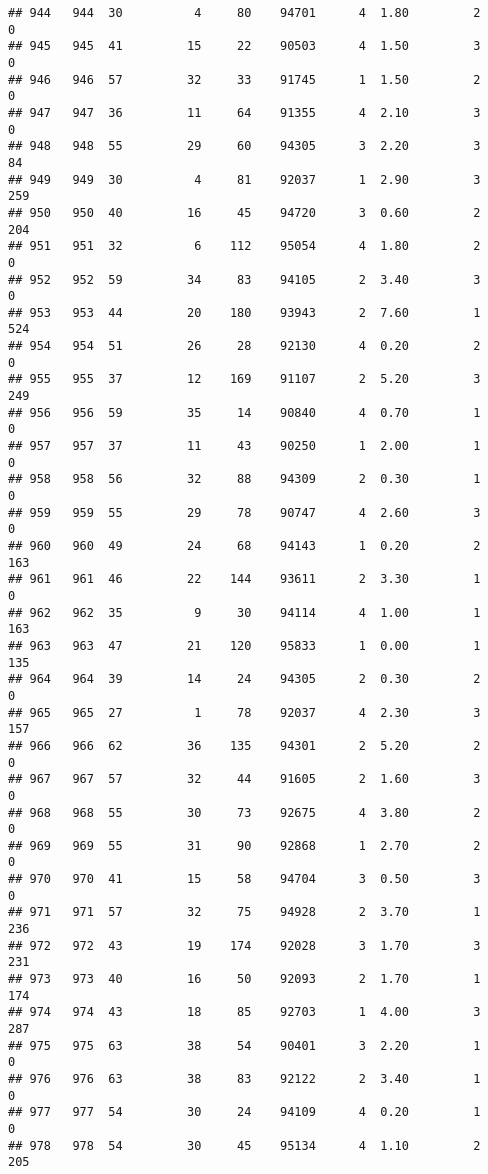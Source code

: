 \documentclass[
]{article}
\begin{document}
\begin{verbatim}
## 944   944  30          4     80    94701      4  1.80         2        0
## 945   945  41         15     22    90503      4  1.50         3        0
## 946   946  57         32     33    91745      1  1.50         2        0
## 947   947  36         11     64    91355      4  2.10         3        0
## 948   948  55         29     60    94305      3  2.20         3       84
## 949   949  30          4     81    92037      1  2.90         3      259
## 950   950  40         16     45    94720      3  0.60         2      204
## 951   951  32          6    112    95054      4  1.80         2        0
## 952   952  59         34     83    94105      2  3.40         3        0
## 953   953  44         20    180    93943      2  7.60         1      524
## 954   954  51         26     28    92130      4  0.20         2        0
## 955   955  37         12    169    91107      2  5.20         3      249
## 956   956  59         35     14    90840      4  0.70         1        0
## 957   957  37         11     43    90250      1  2.00         1        0
## 958   958  56         32     88    94309      2  0.30         1        0
## 959   959  55         29     78    90747      4  2.60         3        0
## 960   960  49         24     68    94143      1  0.20         2      163
## 961   961  46         22    144    93611      2  3.30         1        0
## 962   962  35          9     30    94114      4  1.00         1      163
## 963   963  47         21    120    95833      1  0.00         1      135
## 964   964  39         14     24    94305      2  0.30         2        0
## 965   965  27          1     78    92037      4  2.30         3      157
## 966   966  62         36    135    94301      2  5.20         2        0
## 967   967  57         32     44    91605      2  1.60         3        0
## 968   968  55         30     73    92675      4  3.80         2        0
## 969   969  55         31     90    92868      1  2.70         2        0
## 970   970  41         15     58    94704      3  0.50         3        0
## 971   971  57         32     75    94928      2  3.70         1      236
## 972   972  43         19    174    92028      3  1.70         3      231
## 973   973  40         16     50    92093      2  1.70         1      174
## 974   974  43         18     85    92703      1  4.00         3      287
## 975   975  63         38     54    90401      3  2.20         1        0
## 976   976  63         38     83    92122      2  3.40         1        0
## 977   977  54         30     24    94109      4  0.20         1        0
## 978   978  54         30     45    95134      4  1.10         2      205

\end{verbatim}
\end{document}
